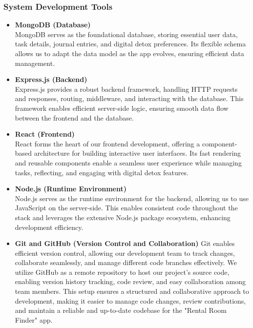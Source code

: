 \subsubsection{System Development Tools}
\begin{itemize}
    \item \textbf{MongoDB (Database)}\\
    MongoDB serves as the foundational database, storing essential user data, task details, journal entries, and digital detox preferences. Its flexible schema allows us to adapt the data model as the app evolves, ensuring efficient data management.
 
    \item \textbf{Express.js (Backend)}\\
    Express.js provides a robust backend framework, handling HTTP requests and responses, routing, middleware, and interacting with the database. This framework enables efficient server-side logic, ensuring smooth data flow between the frontend and the database.

    \item \textbf{React (Frontend)}\\
     React forms the heart of our frontend development, offering a component-based architecture for building interactive user interfaces. Its fast rendering and reusable components enable a seamless user experience while managing tasks, reflecting, and engaging with digital detox features.
     
    \item \textbf{Node.js (Runtime Environment)}\\
    Node.js serves as the runtime environment for the backend, allowing us to use JavaScript on the server-side. This enables consistent code throughout the stack and leverages the extensive Node.js package ecosystem, enhancing development efficiency.
    
     \item \textbf{Git and GitHub (Version Control and Collaboration)}
      Git enables efficient version control, allowing our development team to track changes, collaborate seamlessly, and manage different code branches effectively. We utilize GitHub as a remote repository to host our project's source code, enabling version history tracking, code review, and easy collaboration among team members. This setup ensures a structured and collaborative approach to development, making it easier to manage code changes, review contributions, and maintain a reliable and up-to-date codebase for the "Rental Room Finder" app.
\end{itemize}

